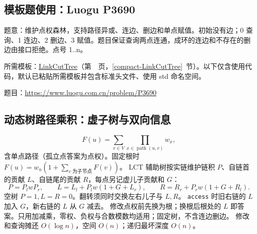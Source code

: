\Needspace{545pt}



\newpage



\newpage



\newpage



\Needspace{466pt}

\subsection*{模板题使用：Luogu P3690}

\label{usage-example-45}

题意：维护点权森林，支持路径异或、连边、删边和单点赋值。初始没有边；0 查询、1 连边、2 删边、3 赋值。题目保证查询两点连通，成环的连边和不存在的删边由接口拒绝。点号 1..n。

所需模板：\hyperref[compact-LinkCutTree]{LinkCutTree}（第~\pageref{compact-LinkCutTree}~页，\ref{compact-LinkCutTree}~节）。以下仅含使用代码，默认已粘贴所需模板并包含标准头文件、使用 std 命名空间。

题目：\url{https://www.luogu.com.cn/problem/P3690}



\subsection{动态树路径乘积：虚子树与双向信息}\label{knowledge-lct-product}
\[
F(u)=\sum_{v\in V}\prod_{x\in\operatorname{path}(u,v)}w_x,
\]
含单点路径（孤立点答案为点权）。固定根时 $F(u)=w_u(1+\sum_{v\text{ 为子节点}}F(v))$。
LCT 辅助树按实链维护链积 $P$、自链首的贡献 $L$、自链尾的贡献 $R$，每点另记虚儿子贡献和 $G$：
\[
P=P_lwP_r,\qquad
L=L_l+P_lw(1+G+L_r),\qquad
R=R_r+P_rw(1+G+R_l).
\]
空树 $P=1,L=R=0$。翻转须同时交换左右儿子与 $L,R$。
\texttt{access} 时旧右链的 $L$ 加入 $G$，新右链的 $L$ 从 $G$ 减去。
修改点权前先换为根；换根后根处的 $L$ 即答案。只用加减乘，零权、负权与合数模数均适用；固定树，不含连边删边。
修改和查询摊还 $O(\log n)$，空间 $O(n)$；递归最坏深度 $O(n)$。



